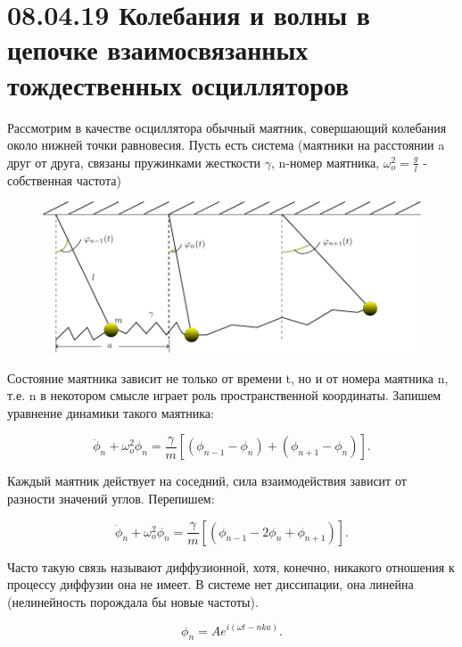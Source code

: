 
\usepackage{graphicx}
\usepackage{wrapfig}
\usepackage{ dsfont }



\tableofcontents\newpage
\section{08.04.19 Колебания и волны в цепочке взаимосвязанных тождественных осцилляторов}

Рассмотрим в качестве осциллятора обычный маятник, совершающий колебания около нижней точки равновесия. Пусть есть система (маятники на расстоянии a друг от друга, связаны пружинками жесткости $\gamma$, n-номер маятника, $\omega_o^2=\frac{g}{l}$ - собственная частота)

\begin{figure}[h!]
	\centering
	\includegraphics[width=0.5\linewidth]{fig/fig1'.pdf}
	\label{fig:fig1}
\end{figure}

Состояние маятника зависит не только от времени t, но и от номера маятника n, т.е. n в некотором смысле играет роль пространственной координаты. Запишем уравнение динамики такого маятника:

\begin{equation}
	\ddot{\phi}_n+\omega^2_o \phi_n=\frac{\gamma}{m}[(\phi_{n-1}-\phi_n)+(\phi_{n+1}-\phi_n)].
	\label{eq:1}
\end{equation}

Каждый маятник действует на соседний, сила взаимодействия зависит от разности значений углов. Перепишем:

\begin{equation*}
	\ddot{\phi}_n+\omega^2_o \phi_n=\frac{\gamma}{m}[(\phi_{n-1}-2\phi_n+\phi_{n+1})].
\end{equation*}

Часто такую связь называют диффузионной, хотя, конечно, никакого отношения к процессу диффузии она не имеет. В системе нет диссипации, она линейна (нелинейность порождала бы новые частоты).

\begin{equation}
	\phi_n=A e^{i(\omega t-nka)}.
	\label{eq:2}
\end{equation}

